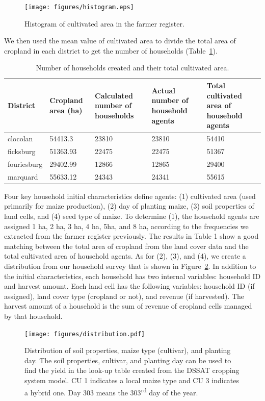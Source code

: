\documentclass[11pt, titlepage]{article}
\begin{document}
\begin{figure}[!ht] 
\centering 
\texttt{[image: figures/histogram.eps]} 
\caption{Histogram of cultivated area in
the farmer register. } 
\label{fig:histo} 
\end{figure}

We then used the mean value of cultivated area to divide the total area of cropland in each district to get the number of households (Table~\ref{tab:numOfHHs}).

\begin{table}[!ht] 
\centering 
\caption{Number of households created and their total cultivated area.} 
\centering
\begin{tabular}{p{2.5cm}|p{2cm}|p{3cm}|p{3cm}|p{3.5cm}} 
\hline District & Cropland area (ha) & Calculated number of households & Actual number of household agents & Total cultivated area of household agents \\
\hline 
clocolan & 54413.3 & 23810 & 23810 & 54410 \\ 
ficksburg & 51363.93 & 22475 & 22475 & 51367 \\ 
fouriesburg & 29402.99 & 12866 & 12865 & 29400 \\ 
marquard & 55633.12 & 24343 & 24341 & 55615 \\ 
\hline
\end{tabular} 
\label{tab:numOfHHs} 
\end{table}

Four key household initial characteristics define agents: (1) cultivated area (used primarily for maize production), (2) day of planting maize, (3) soil properties of land cells, and (4) seed type of maize. To determine (1), the household agents are assigned 1 ha, 2 ha, 3 ha, 4 ha, 5ha, and 8 ha, according to the frequencies we extracted from the farmer register previously. The results in Table 1 show a good matching between the total area of cropland from the land cover data and the total cultivated area of household agents. As for (2), (3), and (4), we create a distribution from our household survey that is shown in Figure~\ref{fig:distribution}. In addition to the initial characteristics, each household has two internal variables: household ID and harvest amount. Each land cell has the following variables: household ID (if assigned), land cover type (cropland or not), and revenue (if harvested). The harvest amount of a household is the sum of revenue of cropland cells managed by that household.

\begin{figure}[!ht] 
\centering 
\texttt{[image: figures/distribution.pdf]} 
\caption{Distribution of soil properties, maize type (cultivar), and planting day. The soil properties, cultivar, and planting day can be used to find the yield in the look-up table created from the DSSAT cropping system model. CU 1 indicates a local maize type and CU 3 indicates a hybrid one. Day 303 means the 303\textsuperscript{rd} day of the year.} %
\label{fig:distribution} \end{figure}
\end{document}
